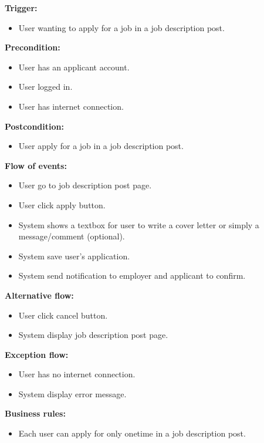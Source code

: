 \documentclass[a4paper]{article}
\begin{document}
\textbf{Trigger:}
\begin{itemize}
    \item User wanting to apply for a job in a job description post.
\end{itemize}

\textbf{Precondition:}
\begin{itemize}
    \item User has an applicant account.
    \item User logged in.
    \item User has internet connection.
\end{itemize}

\textbf{Postcondition:}
\begin{itemize}
    \item User apply for a job in a job description post.
\end{itemize}

\textbf{Flow of events:}
\begin{itemize}
    \item User go to job description post page.
    \item User click apply button.
    \item System shows a textbox for user to write a cover letter or simply a message/comment (optional).
    \item System save user's application.
    \item System send notification to employer and applicant to confirm.
\end{itemize}

\textbf{Alternative flow:}
\begin{itemize}
    \item User click cancel button.
    \item System display job description post page.
\end{itemize}

\textbf{Exception flow:}
\begin{itemize}
    \item User has no internet connection.
    \item System display error message.
\end{itemize}

\textbf{Business rules:}
\begin{itemize}
    \item Each user can apply for only onetime in a job description post.
\end{itemize}
\end{document}
